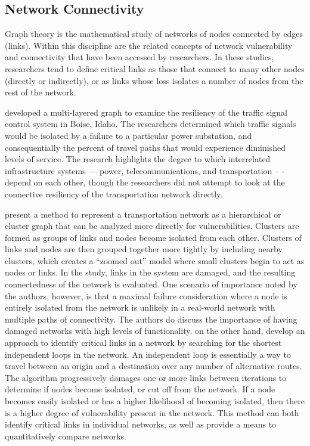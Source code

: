 \subsection{Network Connectivity}

Graph theory is the mathematical study of networks of nodes connected by
edges (links). Within
this discipline are the related concepts of network vulnerability and
connectivity that have been
accessed by researchers. In these studies, researchers tend to define
critical links as those
that connect to many other nodes (directly or indirectly), or as links
whose loss isolates a
number of nodes from the rest of the network.

\citet{abdel2007} developed a multi-layered graph to examine the resiliency
of the traffic
signal control system in Boise, Idaho. The researchers determined which
traffic signals would be isolated by a failure to a particular power
substation,
and consequentially the percent of travel paths that would experience
diminished
levels of service. The research highlights the degree to which interrelated
infrastructure systems --- power, telecommunications, and transportation --
-
depend on each other, though the researchers did not attempt to look at the
connective resiliency of the transportation network directly.

\citet{agarwal2011} present a method to represent a transportation network
as a
hierarchical or cluster graph that can be analyzed more directly for
vulnerabilities. Clusters are formed as groups of links and nodes become
isolated from each other. Clusters of links and nodes are then grouped
together more tightly by including nearby clusters, which creates a
``zoomed out'' model where small clusters begin to act as nodes or links.
In the study, links in the system are damaged, and the resulting
connectedness of the network is evaluated. One scenario of importance
noted by the authors, however, is that a maximal failure consideration where a
node
is entirely isolated from the network is unlikely in a real-world network
with
multiple paths of connectivity. The authors do discuss the importance of
having damaged networks with high levels of functionality. \citet{vodak2019}
on the other hand, develop an approach to identify
critical links in a network by searching for the shortest independent
loops in the network. An independent loop is essentially a way to travel
between an origin and a destination over any number of alternative routes.
The algorithm progressively damages one or more links
between iterations to determine if nodes become isolated, or cut off from
the
network. If a node becomes easily isolated or has a higher likelihood of
becoming isolated, then there is a higher degree of vulnerability present
in the
network. This method can both identify critical links in individual
networks, as
well as provide a means to quantitatively compare networks.

